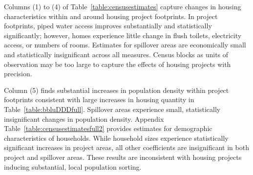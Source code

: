 \documentclass[12pt]{article}
\begin{document}

Columns (1) to (4) of Table~\ref{table:censusestimates} capture changes in housing characteristics within and around housing project footprints.  In project footprints, piped water access improves substantially and statistically significantly; however, homes experience little change in flush toilets, electricity access, or numbers of rooms.  Estimates for spillover areas are economically small and statistically insignificant across all measures.   Census blocks as units of observation may be too large to capture the effects of housing projects with precision.  

Column (5) finds substantial increases in population density within project footprints consistent with large increases in housing quantity in Table~\ref{table:bbluDDDfull}.  Spillover areas experience small, statistically insignificant changes in population density.  Appendix Table~\ref{table:censusestimatesfull2} provides estimates for demographic characteristics of households.  While household sizes experience statistically significant increases in project areas, all other coefficients are insignificant in both project and spillover areas.  These results are inconsistent with housing projects inducing substantial, local population sorting.






\end{document}
